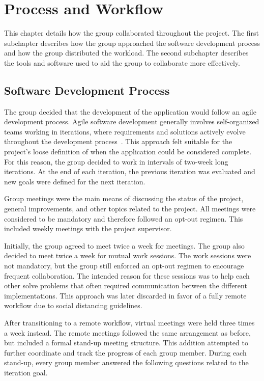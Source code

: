 \section{Process and Workflow}

This chapter details how the group collaborated throughout the project.
The first subchapter describes how the group approached the software development process and how the group distributed the workload.
The second subchapter describes the tools and software used to aid the group to collaborate more effectively.

\subsection{Software Development Process}

The group decided that the development of the application would follow an agile development process.
Agile software development generally involves self-organized teams working in iterations, where requirements and solutions actively evolve throughout the development process~\cite{agile101}.
This approach felt suitable for the project's loose definition of when the application could be considered complete.
For this reason, the group decided to work in intervals of two-week long iterations.
At the end of each iteration, the previous iteration was evaluated and new goals were defined for the next iteration.

Group meetings were the main means of discussing the status of the project, general improvements, and other topics related to the project.
All meetings were considered to be mandatory and therefore followed an opt-out regimen.
This included weekly meetings with the project supervisor.

Initially, the group agreed to meet twice a week for meetings.
The group also decided to meet twice a week for mutual work sessions.
The work sessions were not mandatory, but the group still enforced an opt-out regimen to encourage frequent collaboration.
The intended reason for these sessions was to help each other solve problems that often required communication between the different implementations.
This approach was later discarded in favor of a fully remote workflow due to social distancing guidelines.

After transitioning to a remote workflow, virtual meetings were held three times a week instead.
The remote meetings followed the same arrangement as before, but included a formal stand-up meeting structure.
This addition attempted to further coordinate and track the progress of each group member.
During each stand-up, every group member answered the following questions related to the iteration goal.

